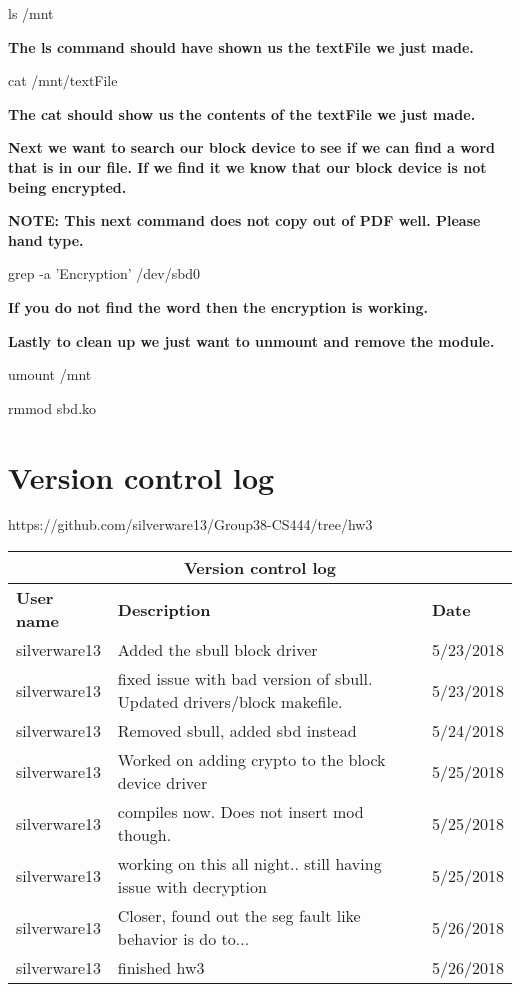 \documentclass[journal,10pt,onecolumn,letterpaper,draftclsnofoot]{IEEEtran}
\begin{document}
ls /mnt\newline


\textbf{The ls command should have shown us the textFile we just made.\newline}

cat /mnt/textFile\newline

\textbf{The cat should show us the contents of the textFile we just made.\newline}

\textbf{Next we want to search our block device to see if we can find a word that is in our file. If we find it we know that our block device is not being encrypted.\newline}

\textbf{NOTE: This next command does not copy out of PDF well. Please hand type.\newline}

grep -a 'Encryption' /dev/sbd0\newline

\textbf{If you do not find the word then the encryption is working.\newline}

\textbf{Lastly to clean up we just want to unmount and remove the module.\newline}

umount /mnt\newline

rmmod sbd.ko\newline

\section{Version control log}
https://github.com/silverware13/Group38-CS444/tree/hw3
\bigskip
\centering
\begin{tabular}{ |p{3cm}|p{10cm}|p{3cm}|  }
 \hline
 \multicolumn{3}{|c|}{\textbf{Version control log}} \\
 \hline
 \textbf{User name} &\textbf{Description} &\textbf{Date}\\
 \hline
 silverware13   & Added the sbull block driver   &5/23/2018\\
 \hline
  silverware13   & fixed issue with bad version of sbull. Updated drivers/block makefile.  &5/23/2018\\
 \hline
  silverware13   & Removed sbull, added sbd instead   &5/24/2018\\
 \hline
   silverware13   & Worked on adding crypto to the block device driver   &5/25/2018\\
 \hline
   silverware13   & compiles now. Does not insert mod though.   &5/25/2018\\
 \hline
   silverware13   & working on this all night.. still having issue with decryption   &5/25/2018\\
 \hline
 	silverware13   & Closer, found out the seg fault like behavior is do to...   &5/26/2018\\
 \hline
	silverware13   & finished hw3 &5/26/2018\\
 \hline
\end{tabular}
\end{document}
